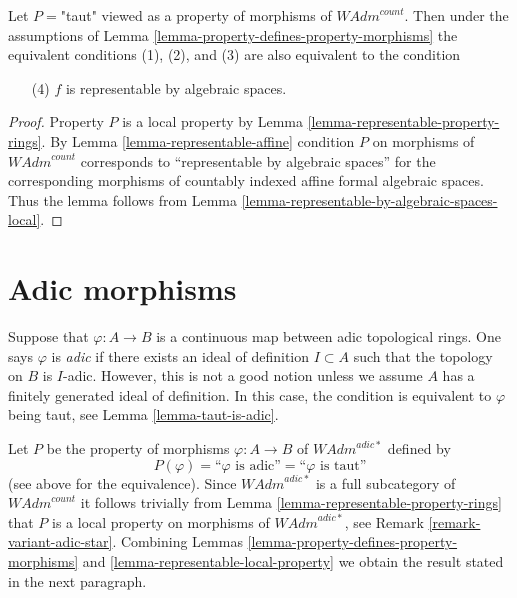 \begin{lemma}
\label{lemma-representable-local-property}
Let $P=$"taut" viewed as a property of morphisms of $\textit{WAdm}^{count}$.
Then under the assumptions of
Lemma \ref{lemma-property-defines-property-morphisms} the equivalent conditions
(1), (2), and (3) are also equivalent to the condition
\begin{enumerate}
\item[(4)] $f$ is representable by algebraic spaces.
\end{enumerate}
\end{lemma}

\begin{proof}
Property $P$ is a local property by
Lemma \ref{lemma-representable-property-rings}.
By Lemma \ref{lemma-representable-affine} condition $P$ on morphisms
of $\textit{WAdm}^{count}$ corresponds to ``representable
by algebraic spaces'' for the corresponding morphisms of
countably indexed affine formal algebraic spaces.
Thus the lemma follows from
Lemma \ref{lemma-representable-by-algebraic-spaces-local}.
\end{proof}









\section{Adic morphisms}
\label{section-adic}

\noindent
Suppose that $\varphi : A \to B$ is a continuous map between
adic topological rings. One says $\varphi$ is {\it adic}
if there exists an ideal of definition $I \subset A$ such that
the topology on $B$ is $I$-adic. However, this is not a good notion
unless we assume $A$ has a finitely generated ideal of definition.
In this case, the condition is equivalent
to $\varphi$ being taut, see Lemma \ref{lemma-taut-is-adic}.

\medskip\noindent
Let $P$ be the property of morphisms $\varphi : A \to B$
of $\textit{WAdm}^{adic*}$ defined by
$$
P(\varphi)=\text{``}\varphi\text{ is adic''}=\text{``}\varphi\text{ is taut''}
$$
(see above for the equivalence).
Since $\textit{WAdm}^{adic*}$ is a full subcategory of
$\textit{WAdm}^{count}$ it follows trivially from
Lemma \ref{lemma-representable-property-rings} that $P$
is a local property on morphisms of $\textit{WAdm}^{adic*}$,
see Remark \ref{remark-variant-adic-star}. Combining
Lemmas \ref{lemma-property-defines-property-morphisms} and
\ref{lemma-representable-local-property}
we obtain the result stated in the next paragraph.

